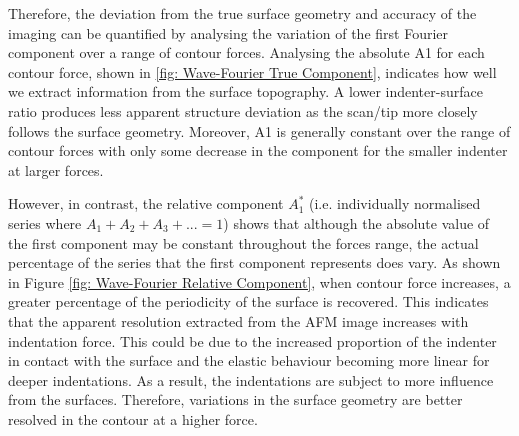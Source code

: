 Therefore, the deviation from the true surface geometry and accuracy of the imaging can be quantified by analysing the variation of the first Fourier component over a range of contour forces. Analysing the absolute A1 for each contour force, shown in \ref{fig: Wave-Fourier True Component}, indicates how well we extract information from the surface topography. A lower indenter-surface ratio produces less apparent structure deviation as the scan/tip more closely follows the surface geometry. Moreover, A1 is generally constant over the range of contour forces with only some decrease in the component for the smaller indenter at larger forces.  

However, in contrast, the relative component $A^*_1$ (i.e. individually normalised series where $A_1+A_2+A_3+... = 1$) shows that although the absolute value of the first component may be constant throughout the forces range, the actual percentage of the series that the first component represents does vary. As shown in Figure \ref{fig: Wave-Fourier Relative Component}, when contour force increases, a greater percentage of the periodicity of the surface is recovered. This indicates that the apparent resolution extracted from the AFM image increases with indentation force. This could be due to the increased proportion of the indenter in contact with the surface and the elastic behaviour becoming more linear for deeper  indentations. As a result, the indentations are subject to more influence from the surfaces. Therefore, variations in the surface geometry are better resolved in the contour at a higher force. 

